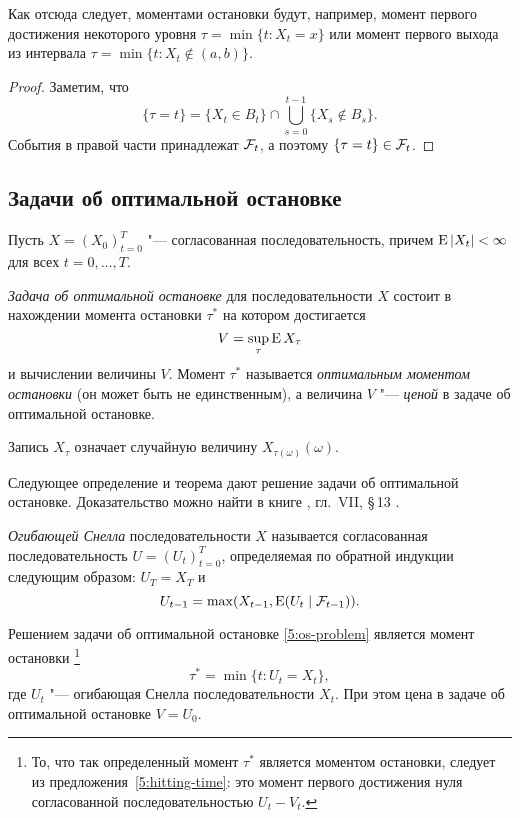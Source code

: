 Как отсюда следует, моментами остановки будут, например, момент первого достижения некоторого уровня $\tau=\min\{t : X_t = x\}$ или момент первого выхода из интервала $\tau=\min\{t : X_t\notin (a,b)\}$. 

\begin{proof}
Заметим, что
\[
\{\tau = t\} = \{X_t \in B_t\} \cap \bigcup_{s=0}^{t-1} \{X_s \notin B_s\}.
\]
События в правой части принадлежат $\mathcal{F}_t$, а поэтому $\{\tau=t\}\in\mathcal{F}_t$.
\end{proof}


\subsection{Задачи об оптимальной остановке}

Пусть $X=(X_0)_{t=0}^T$ "--- согласованная последовательность, причем $\operatorname{E}|X_t| < \infty$ для всех $t=0,\dots,T$.

\begin{definition}
\emph{Задача об оптимальной остановке} для последовательности $X$ состоит в нахождении момента остановки $\tau^*$ на котором достигается
\begin{equation}
\label{5:os-problem}
V = \sup_\tau \operatorname{E} X_\tau
\end{equation}
и вычислении величины $V$.
Момент $\tau^*$ называется \emph{оптимальным моментом остановки} (он может быть не единственным), а величина $V$ "--- \emph{ценой} в задаче об оптимальной остановке.
\end{definition}

\begin{remark}
Запись $X_\tau$ означает случайную величину $X_{\tau(\omega)}(\omega)$.
\end{remark}

Следующее определение и теорема дают решение задачи об оптимальной остановке.
Доказательство можно найти в книге \cite{Shiryaev04}, гл.~VII, \S\,13 .

\begin{definition}
\emph{Огибающей Снелла} последовательности $X$ называется согласованная последовательность $U=(U_t)_{t=0}^T$, определяемая по обратной индукции следующим образом: $U_T=X_T$ и 
\[
U_{t-1} = \max (X_{t-1}, \operatorname{E}(U_t\mid \mathcal{F}_{t-1})).
\]
\end{definition}

\begin{theorem}
\label{5:os-solution}
Решением задачи об оптимальной остановке \eqref{5:os-problem} является момент остановки%
\footnote{То, что так определенный момент $\tau^*$ является моментом остановки, следует из предложения~\ref{5:hitting-time}: это момент первого достижения нуля согласованной последовательностью $U_t-V_t$.}
\[
\tau^* = \min\{t : U_t = X_t\},
\]
где $U_t$ "--- огибающая Снелла последовательности $X_t$.
При этом цена в задаче об оптимальной остановке $V = U_0$.
\end{theorem}

